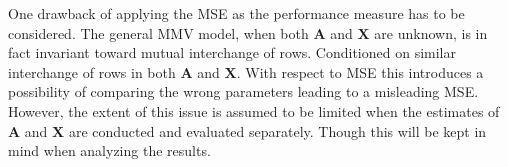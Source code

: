 One drawback of applying the MSE as the performance measure has to be considered. The general MMV model, when both $\textbf{A}$ and $\textbf{X}$ are unknown, is in fact invariant toward mutual interchange of rows. Conditioned on similar interchange of rows in both $\textbf{A}$ and $\textbf{X}$. With respect to MSE this introduces a possibility of comparing the wrong parameters leading to a misleading MSE. However, the extent of this issue is assumed to be limited when the estimates of $\textbf{A}$ and $\textbf{X}$ are conducted and evaluated separately. Though this will be kept in mind when analyzing the results.        

